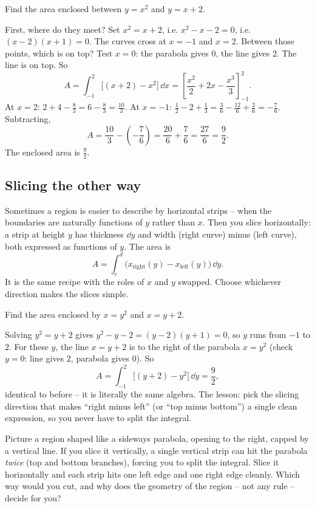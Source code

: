 \begin{example}
\label{ch26:ex-parab-line}
Find the area enclosed between $y = x^2$ and $y = x+2$.

First, where do they meet? Set $x^2 = x+2$, i.e. $x^2-x-2=0$, i.e.
$(x-2)(x+1)=0$. The curves cross at $x=-1$ and $x=2$. Between those points, which
is on top? Test $x=0$: the parabola gives $0$, the line gives $2$. The line is
on top. So
\[
  A = \int_{-1}^{2}\bigl[(x+2)-x^2\bigr]\,\dd x
    = \left[\frac{x^2}{2}+2x-\frac{x^3}{3}\right]_{-1}^{2}.
\]
At $x=2$: $2 + 4 - \tfrac{8}{3} = 6 - \tfrac{8}{3} = \tfrac{10}{3}$.
At $x=-1$: $\tfrac12 - 2 + \tfrac13 = \tfrac{3}{6}-\tfrac{12}{6}+\tfrac{2}{6}
= -\tfrac{7}{6}$.
Subtracting,
\[
  A = \frac{10}{3} - \left(-\frac{7}{6}\right) = \frac{20}{6}+\frac{7}{6}
    = \frac{27}{6} = \frac{9}{2}.
\]
The enclosed area is $\tfrac{9}{2}$.
\end{example}

\subsection{Slicing the other way}

Sometimes a region is easier to describe by horizontal strips -- when the
boundaries are naturally functions of $y$ rather than $x$. Then you slice
horizontally: a strip at height $y$ has thickness $\dd y$ and width
(right curve) minus (left curve), both expressed as functions of $y$. The area is
\[
  A = \int_c^d \bigl(x_{\text{right}}(y) - x_{\text{left}}(y)\bigr)\,\dd y.
\]
It is the same recipe with the roles of $x$ and $y$ swapped. Choose whichever
direction makes the slices simple.

\begin{example}
\label{ch26:ex-horiz}
Find the area enclosed by $x = y^2$ and $x = y+2$.

Solving $y^2 = y+2$ gives $y^2-y-2 = (y-2)(y+1) = 0$, so $y$ runs from $-1$ to
$2$. For these $y$, the line $x=y+2$ is to the right of the parabola $x=y^2$
(check $y=0$: line gives $2$, parabola gives $0$). So
\[
  A = \int_{-1}^{2}\bigl[(y+2)-y^2\bigr]\,\dd y = \frac{9}{2},
\]
identical to before -- it is literally the same algebra. The lesson: pick the
slicing direction that makes ``right minus left'' (or ``top minus bottom'') a
single clean expression, so you never have to split the integral.
\end{example}

\begin{walkbox}
Picture a region shaped like a sideways parabola, opening to the right, capped by
a vertical line. If you slice it vertically, a single vertical strip can hit the
parabola \emph{twice} (top and bottom branches), forcing you to split the
integral. Slice it horizontally and each strip hits one left edge and one right
edge cleanly. Which way would you cut, and why does the geometry of the region --
not any rule -- decide for you?
\end{walkbox}

